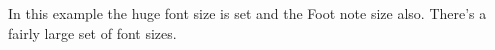 In this example the {\huge huge font size} is set and 
the {\footnotesize Foot note size also}.
There's a fairly large set of font sizes.